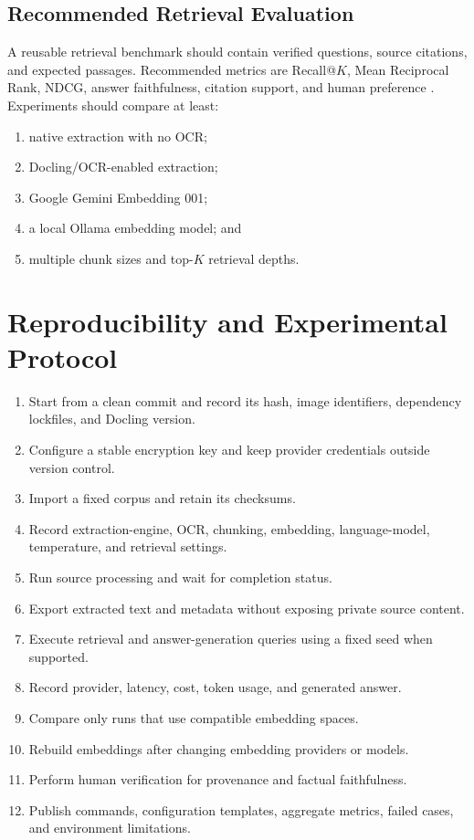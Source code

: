 \documentclass[conference]{IEEEtran}
\begin{document}
\subsection{Recommended Retrieval Evaluation}
A reusable retrieval benchmark should contain verified questions, source citations, and expected passages. Recommended metrics are Recall@$K$, Mean Reciprocal Rank, NDCG, answer faithfulness, citation support, and human preference \cite{ragEval2024}. Experiments should compare at least:
\begin{enumerate}
 \item native extraction with no OCR;
 \item Docling/OCR-enabled extraction;
 \item Google Gemini Embedding 001;
 \item a local Ollama embedding model; and
 \item multiple chunk sizes and top-$K$ retrieval depths.
\end{enumerate}

\section{Reproducibility and Experimental Protocol}
\begin{enumerate}
 \item Start from a clean commit and record its hash, image identifiers, dependency lockfiles, and Docling version.
 \item Configure a stable encryption key and keep provider credentials outside version control.
 \item Import a fixed corpus and retain its checksums.
 \item Record extraction-engine, OCR, chunking, embedding, language-model, temperature, and retrieval settings.
 \item Run source processing and wait for completion status.
 \item Export extracted text and metadata without exposing private source content.
 \item Execute retrieval and answer-generation queries using a fixed seed when supported.
 \item Record provider, latency, cost, token usage, and generated answer.
 \item Compare only runs that use compatible embedding spaces.
 \item Rebuild embeddings after changing embedding providers or models.
 \item Perform human verification for provenance and factual faithfulness.
 \item Publish commands, configuration templates, aggregate metrics, failed cases, and environment limitations.
\end{enumerate}
\end{document}
